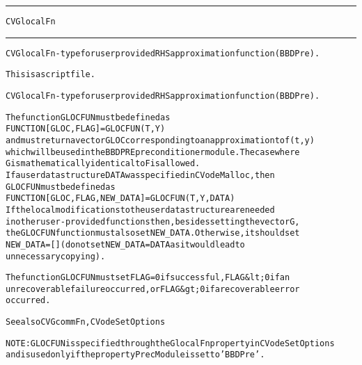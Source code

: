 \begin{samepage}
\hrule
\begin{center}
{\large \verb!CVGlocalFn!}
\label{p:CVGlocalFn}
\end{center}
\hrule\vspace{0.1in}



\begin{alltt}
CVGlocalFn - type for user provided RHS approximation function (BBDPre).
\end{alltt}

\end{samepage}



\begin{samepage}


\begin{alltt}
This is a script file. 
\end{alltt}

\end{samepage}



\begin{alltt}
CVGlocalFn - type for user provided RHS approximation function (BBDPre).

   The function GLOCFUN must be defined as 
        FUNCTION [GLOC, FLAG] = GLOCFUN(T,Y)
   and must return a vector GLOC corresponding to an approximation to f(t,y)
   which will be used in the BBDPRE preconditioner module. The case where
   G is mathematically identical to F is allowed.
   If a user data structure DATA was specified in CVodeMalloc, then
   GLOCFUN must be defined as
        FUNCTION [GLOC, FLAG, NEW_DATA] = GLOCFUN(T,Y,DATA)
   If the local modifications to the user data structure are needed 
   in other user-provided functions then, besides setting the vector G,
   the GLOCFUN function must also set NEW_DATA. Otherwise, it should set
   NEW_DATA=[] (do not set NEW_DATA = DATA as it would lead to
   unnecessary copying).

   The function GLOCFUN must set FLAG=0 if successful, FLAG&lt;0 if an
   unrecoverable failure occurred, or FLAG&gt;0 if a recoverable error
   occurred.

   See also CVGcommFn, CVodeSetOptions

   NOTE: GLOCFUN is specified through the GlocalFn property in CVodeSetOptions
   and is used only if the property PrecModule is set to 'BBDPre'.
\end{alltt}






\vspace{0.1in}